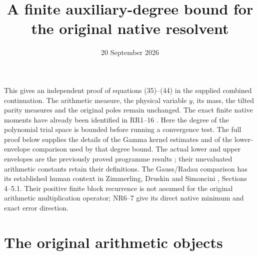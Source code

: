 \documentclass[11pt]{article}
\title{A finite auxiliary-degree bound for the original native resolvent}
\author{}
\date{20 September 2026}
\begin{document}
\maketitle

This gives an independent proof of equations (35)--(44) in the supplied
combined continuation. The arithmetic measure, the physical variable
$y$, its mass, the tilted parity measures and the original poles remain
unchanged. The exact finite native moments have already been identified
in RR1--16 \cite{RR}. Here the degree of the polynomial trial space is
bounded before running a convergence test. The full proof below supplies
the details of the Gamma kernel estimates and of the lower-envelope
comparison used by that degree bound. The actual lower and upper
envelopes are the previously proved programme results \cite{NP}; their
unevaluated arithmetic constants retain their definitions.
The Gauss/Radau comparison has its established human context in
Zimmerling, Druskin and Simoncini \cite{ZDS}, Sections 4--5.1.
Their positive finite block recurrence is not assumed for the original
arithmetic multiplication operator; NR6--7 give its direct native
minimum and exact error direction.

\section{The original arithmetic objects}
\end{document}
